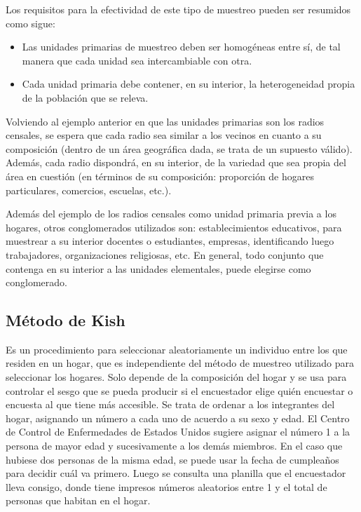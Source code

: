 \documentclass[]{book}
\begin{document}
Los requisitos para la efectividad de este tipo de muestreo pueden ser
resumidos como sigue:

\begin{itemize}
\item
  Las unidades primarias de muestreo deben ser homogéneas entre sí, de
  tal manera que cada unidad sea intercambiable con otra.
\item
  Cada unidad primaria debe contener, en su interior, la heterogeneidad propia de la población que se releva.
\end{itemize}

Volviendo al ejemplo anterior en que las unidades primarias son los radios censales, se espera que cada radio sea similar a los vecinos en cuanto a su composición (dentro de un área geográfica dada, se trata de un supuesto válido). Además, cada radio dispondrá, en su interior, de la
variedad que sea propia del área en cuestión (en términos de su
composición: proporción de hogares particulares, comercios, escuelas, etc.).

Además del ejemplo de los radios censales como unidad primaria previa a los hogares, otros conglomerados utilizados son: establecimientos educativos, para muestrear a su interior docentes o estudiantes, empresas, identificando luego trabajadores, organizaciones religiosas, etc. En general, todo conjunto que contenga en su interior a las unidades elementales, puede elegirse como conglomerado.

\hypertarget{metodo-de-kish}{%
\subsection{Método de Kish}\label{metodo-de-kish}}

Es un procedimiento para seleccionar aleatoriamente un individuo entre los que residen en un hogar, que es independiente del método de muestreo utilizado para seleccionar los hogares. Solo depende de la composición del hogar y se usa para controlar el sesgo que se pueda producir si el encuestador elige quién encuestar o encuesta al que tiene más accesible.
Se trata de ordenar a los integrantes del hogar, asignando un número a cada uno de acuerdo a su sexo y edad. El Centro de Control de Enfermedades de Estados Unidos sugiere asignar el número 1 a la persona de mayor edad y sucesivamente a los demás miembros. En el caso que hubiese dos personas de la misma edad, se puede usar la fecha de cumpleaños para decidir cuál va primero. Luego se consulta una planilla que el encuestador lleva consigo, donde tiene impresos números aleatorios entre 1 y el total de personas que habitan en el hogar.
\end{document}
